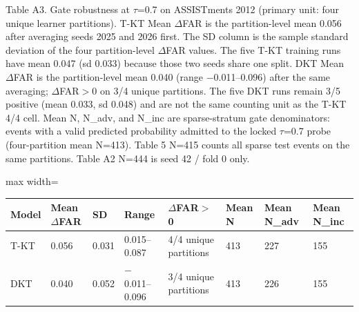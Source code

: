 \documentclass[10pt,a4paper]{article}
\begin{document}
\noindent\begin{minipage}{\textwidth}
\centering
{\fontsize{8}{9.5}\selectfont Table A3. Gate robustness at $\tau$=0.7 on ASSISTments 2012 (primary unit: four unique learner partitions). T-KT Mean $\Delta$FAR is the partition-level mean 0.056 after averaging seeds 2025 and 2026 first. The SD column is the sample standard deviation of the four partition-level $\Delta$FAR values. The five T-KT training runs have mean 0.047 (sd 0.033) because those two seeds share one split. DKT Mean $\Delta$FAR is the partition-level mean 0.040 (range $-$0.011--0.096) after the same averaging; $\Delta$FAR$>$0 on 3/4 unique partitions. The five DKT runs remain 3/5 positive (mean 0.033, sd 0.048) and are not the same counting unit as the T-KT 4/4 cell. Mean N, N\_adv, and N\_inc are sparse-stratum gate denominators: events with a valid predicted probability admitted to the locked $\tau$=0.7 probe (four-partition mean N=413). Table 5 N=415 counts all sparse test events on the same partitions. Table A2 N=444 is seed 42 / fold 0 only.\par}
\vspace{0.35em}
\begin{adjustbox}{max width=\textwidth}
{\small
\begin{tabular}{@{}llllllll@{}}
\toprule
Model & Mean $\Delta$FAR & SD & Range & $\Delta$FAR$>$0 & Mean N & Mean N\_adv & Mean N\_inc \\
\midrule
T-KT & 0.056 & 0.031 & 0.015--0.087 & 4/4 unique partitions & 413 & 227 & 155 \\
DKT & 0.040 & 0.052 & $-$0.011--0.096 & 3/4 unique partitions & 413 & 226 & 155 \\
\bottomrule
\end{tabular}}
\end{adjustbox}
\end{minipage}
\vspace{18pt}
\end{document}
